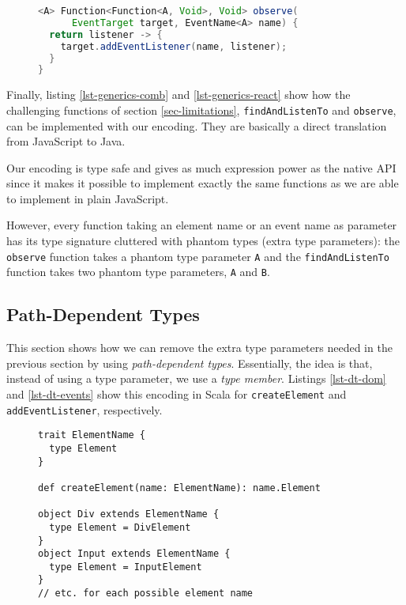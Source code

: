 \documentclass{llncs}
\newcommand{\jscode}[1]{\lstinline[language=JavaScript]|#1|}
\newcommand{\scalacode}[1]{\lstinline[language=Scala]|#1|}
\begin{document}
\begin{figure}
\begin{lstlisting}[label=lst-generics-react,language=java,caption={Partial application of \scalacode{addEventListener} encoded with type parameters}]
<A> Function<Function<A, Void>, Void> observe(
      EventTarget target, EventName<A> name) {
  return listener -> {
    target.addEventListener(name, listener);
  }
}
\end{lstlisting}
\end{figure}

Finally, listing \ref{lst-generics-comb} and \ref{lst-generics-react} show how the challenging functions of section \ref{sec-limitations}, \jscode{findAndListenTo} and \jscode{observe}, can be implemented with our encoding. They are basically a direct translation from JavaScript to Java.

Our encoding is type safe and gives as much expression power as the native API since it makes it possible to implement exactly the same functions as we are able to implement in plain JavaScript.

However, every function taking an element name or an event name as parameter has its type signature cluttered with phantom types (extra type parameters): the \scalacode{observe} function takes a phantom type parameter \scalacode{A} and the \scalacode{findAndListenTo} function takes two phantom type parameters, \scalacode{A} and \scalacode{B}.

\subsection{Path-Dependent Types}

This section shows how we can remove the extra type parameters needed in the previous section by using \emph{path-dependent types}. Essentially, the idea is that, instead of using a type parameter, we use a \emph{type member}. Listings \ref{lst-dt-dom} and \ref{lst-dt-events} show this encoding in Scala for \jscode{createElement} and \jscode{addEventListener}, respectively.

\begin{figure}
\begin{lstlisting}[label=lst-dt-dom,caption={Encoding of \jscode{createElement} using path-dependent types}]
trait ElementName {
  type Element
}

def createElement(name: ElementName): name.Element

object Div extends ElementName {
  type Element = DivElement
}
object Input extends ElementName {
  type Element = InputElement
}
// etc. for each possible element name
\end{lstlisting}
\end{figure}
\end{document}
